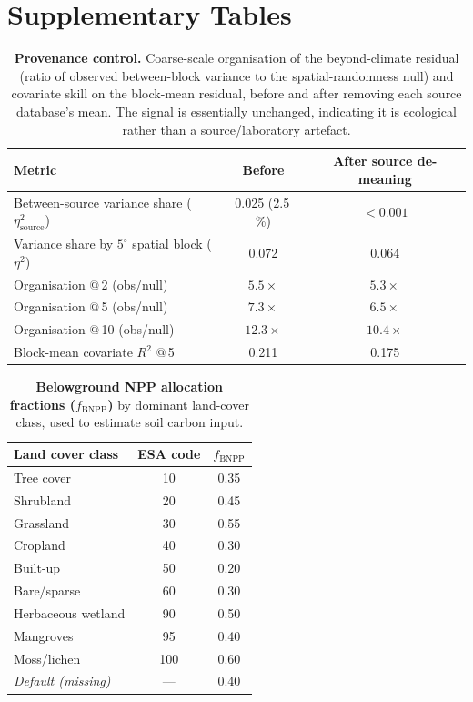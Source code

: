 \documentclass[12pt, a4paper]{article}
\begin{document}
\section{Supplementary Tables}

\begin{table}[h!]
  \centering\small
  \caption{\textbf{Provenance control.} Coarse-scale organisation of the beyond-climate
  residual (ratio of observed between-block variance to the spatial-randomness null) and
  covariate skill on the block-mean residual, before and after removing each source
  database's mean. The signal is essentially unchanged, indicating it is ecological
  rather than a source/laboratory artefact.}
  \label{stab:provenance}
  \begin{tabular}{lcc}
    \toprule
    Metric & Before & After source de-meaning \\
    \midrule
    Between-source variance share ($\eta^2_\text{source}$) & 0.025 (2.5\,\%) & $<0.001$ \\
    Variance share by $5^{\circ}$ spatial block ($\eta^2$) & 0.072 & 0.064 \\
    Organisation @\,2\textdegree{} (obs/null)   & $5.5\times$  & $5.3\times$ \\
    Organisation @\,5\textdegree{} (obs/null)   & $7.3\times$  & $6.5\times$ \\
    Organisation @\,10\textdegree{} (obs/null)  & $12.3\times$ & $10.4\times$ \\
    Block-mean covariate $R^2$ @\,5\textdegree{} & 0.211 & 0.175 \\
    \bottomrule
  \end{tabular}
\end{table}

\begin{table}[h!]
  \centering\small
  \caption{\textbf{Belowground NPP allocation fractions ($f_\text{BNPP}$)} by dominant
  land-cover class, used to estimate soil carbon input.}
  \label{stab:allocation}
  \begin{tabular}{lcc}
    \toprule
    Land cover class & ESA code & $f_\text{BNPP}$ \\
    \midrule
    Tree cover & 10 & 0.35 \\
    Shrubland & 20 & 0.45 \\
    Grassland & 30 & 0.55 \\
    Cropland & 40 & 0.30 \\
    Built-up & 50 & 0.20 \\
    Bare/sparse & 60 & 0.30 \\
    Herbaceous wetland & 90 & 0.50 \\
    Mangroves & 95 & 0.40 \\
    Moss/lichen & 100 & 0.60 \\
    \midrule
    \textit{Default (missing)} & --- & 0.40 \\
    \bottomrule
  \end{tabular}
\end{table}
\end{document}
